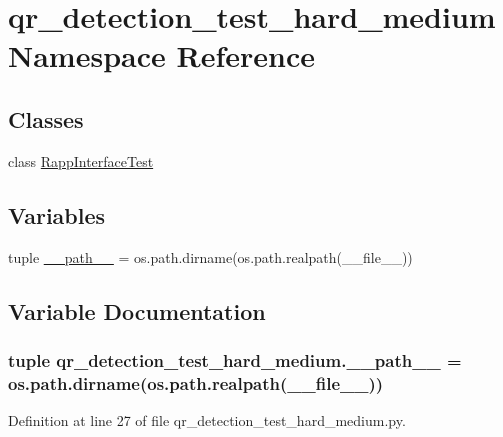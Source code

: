 \hypertarget{namespaceqr__detection__test__hard__medium}{\section{qr\-\_\-detection\-\_\-test\-\_\-hard\-\_\-medium Namespace Reference}
\label{namespaceqr__detection__test__hard__medium}
}
\subsection*{Classes}
\begin{DoxyCompactItemize}
\item 
class \hyperlink{classqr__detection__test__hard__medium_1_1RappInterfaceTest}{Rapp\-Interface\-Test}
\end{DoxyCompactItemize}
\subsection*{Variables}
\begin{DoxyCompactItemize}
\item 
tuple \hyperlink{namespaceqr__detection__test__hard__medium_acba98a9f7225cce08e148ebf78bd8158}{\-\_\-\-\_\-path\-\_\-\-\_\-} = os.\-path.\-dirname(os.\-path.\-realpath(\-\_\-\-\_\-file\-\_\-\-\_\-))
\end{DoxyCompactItemize}


\subsection{Variable Documentation}
\hypertarget{namespaceqr__detection__test__hard__medium_acba98a9f7225cce08e148ebf78bd8158}{
\subsubsection[{\-\_\-\-\_\-path\-\_\-\-\_\-}]{\setlength{\rightskip}{0pt plus 5cm}tuple qr\-\_\-detection\-\_\-test\-\_\-hard\-\_\-medium.\-\_\-\-\_\-path\-\_\-\-\_\- = os.\-path.\-dirname(os.\-path.\-realpath(\-\_\-\-\_\-file\-\_\-\-\_\-))}}\label{namespaceqr__detection__test__hard__medium_acba98a9f7225cce08e148ebf78bd8158}


Definition at line 27 of file qr\-\_\-detection\-\_\-test\-\_\-hard\-\_\-medium.\-py.

